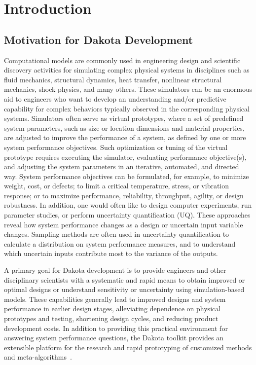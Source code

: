 \chapter{Introduction}\label{intro}

\section{Motivation for Dakota Development}\label{intro:motivation}

Computational models are commonly used in engineering design and
scientific discovery activities for simulating complex physical
systems in disciplines such as fluid mechanics, structural dynamics,
heat transfer, nonlinear structural mechanics, shock physics, and many
others. These simulators can be an enormous aid to engineers who want
to develop an understanding and/or predictive capability for complex
behaviors typically observed in the corresponding physical
systems. Simulators often serve as virtual prototypes, where a set of
predefined system parameters, such as size or location dimensions and
material properties, are adjusted to improve the performance of a
system, as defined by one or more system performance objectives. Such
optimization or tuning of the virtual prototype requires executing the
simulator, evaluating performance objective(s), and adjusting the
system parameters in an iterative, automated, and directed way. System
performance objectives can be formulated, for example, to minimize
weight, cost, or defects; to limit a critical temperature, stress, or
vibration response; or to maximize performance, reliability,
throughput, agility, or design robustness. In addition, one would
often like to design computer experiments, run parameter studies, or
perform uncertainty quantification (UQ). These approaches reveal how
system performance changes as a design or uncertain input variable
changes. Sampling methods are often used in uncertainty
quantification to calculate a distribution on system performance
measures, and to understand which uncertain inputs contribute most to
the variance of the outputs.

A primary goal for Dakota development is to provide engineers and
other disciplinary scientists with a systematic and rapid means to
obtain improved or optimal designs or understand sensitivity or
uncertainty using simulation-based models. These capabilities
generally lead to improved designs and system performance in earlier
design stages, alleviating dependence on physical prototypes and
testing, shortening design cycles, and reducing product development
costs. In addition to providing this practical environment for
answering system performance questions, the Dakota toolkit provides an
extensible platform for the research and rapid prototyping of
customized methods and meta-algorithms~\cite{Eld98b}.

